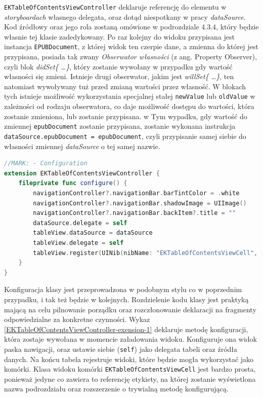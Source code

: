 \texttt{EKTableOfContentsViewController} deklaruje referencję do elementu w \textit{storyboardach} własnego delegata, oraz dotąd niespotkany w pracy \textit{dataSource}. Kod źródłowy oraz jego rola zostaną omówione w podrozdziale 4.3.4, który będzie własnie tej klasie zadedykowany. Po raz kolejny do widoku przypisana jest instancja \texttt{EPUBDocument}, z której widok ten czerpie dane, a zmienna do której jest przypisana, posiada tak zwany \textit{Obserwator własności} (z ang. Property Observer), czyli blok \textit{didSet\{ \ldots \}}, który zostanie wywołany w przypadku gdy wartość własności się zmieni. Istnieje drugi obserwator, jakim jest \textit{willSet\{ \ldots \}}, ten natomiast wywoływany tuż przed zmianą wartości przez własność. W blokach tych istnieje możliwość wykorzystania specjalnej stałej \texttt{newValue} lub \texttt{oldValue} w zależności od rodzaju obserwatora, co daje możliwość dostępu do wartości, która zostanie zmieniona, lub zostanie przypisana. w Tym wypadku, gdy wartość do zmiennej \texttt{epubDocument} zostanie przypisana, zostanie wykonana instrukcja \texttt{dataSource.epubDocument = epubDocument}, czyli przypisanie samej siebie do własności zmiennej \textit{dataSource} o tej samej nazwie.

\begin{lstlisting}[language=swift,caption={Rozszerzenie klasy \texttt{EKTableOfContentsViewController} o metodę konfiguracji},label=EKTableOfContentsViewController-exension-1]
//MARK: - Configuration
extension EKTableOfContentsViewController {
    fileprivate func configure() {
        navigationController?.navigationBar.barTintColor = .white
        navigationController?.navigationBar.shadowImage = UIImage()
        navigationController?.navigationBar.backItem?.title = ""
        dataSource.delegate = self
        tableView.dataSource = dataSource
        tableView.delegate = self
        tableView.register(UINib(nibName: "EKTableOfContentsViewCell", bundle: Bundle(for: classForCoder)), forCellReuseIdentifier: "EKTableOfContentsViewCell")
    }
}
\end{lstlisting}

Konfiguracja klasy jest przeprowadzona w podobnym stylu co w poprzednim przypadku, i tak też będzie w kolejnych. Rozdzielenie kodu klasy jest praktyką mającą na celu pilnowanie porządku oraz rozczłonowanie deklaracji na fragmenty odpowiedzialne za konkretne czynności. Wykaz \ref{EKTableOfContentsViewController-exension-1} deklaruje metodę konfiguracji, która zostaje wywołana w momencie załadowania widoku. Konfiguruje ona widok paska nawigacji, oraz ustawie siebie (\texttt{self}) jako delegata tabeli oraz źródła danych. Na końcu tabela rejestruje widoki, które będzie mogła wykorzystać jako komórki. Klasa widoku komórki \texttt{EKTableOfContentsViewCell} jest bardzo prosta, ponieważ jedyne co zawiera to referencję etykiety, na której zostanie wyświetlona nazwa podrozdziału oraz rozszerzenie o trywialną metodę konfigurującą.


